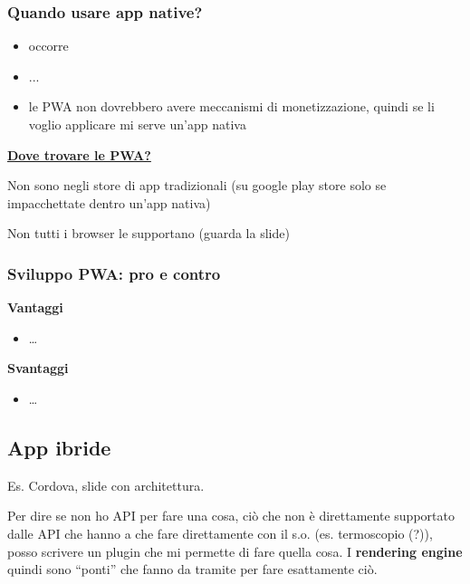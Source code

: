 \subsubsection{Quando usare app native?}
\begin{itemize}
    \item occorre 
    \item ...
    \item le PWA non dovrebbero avere meccanismi di monetizzazione, quindi se li voglio applicare mi serve un'app nativa
\end{itemize}
\par \textbf{\underline{Dove trovare le PWA?}}
\par Non sono negli store di app tradizionali (su google play store solo se impacchettate dentro un'app nativa)
\par Non tutti i browser le supportano (guarda la slide)

\subsubsection{Sviluppo PWA: pro e contro}
\par \textbf{Vantaggi}
\begin{itemize}
    \item \dots
\end{itemize}
\par \textbf{Svantaggi}
\begin{itemize}
    \item \dots
\end{itemize}

\subsection{App ibride}
\par Es. Cordova, slide con architettura.
\par Per dire se non ho API per fare una cosa, ciò che non è direttamente supportato dalle API che hanno a che fare direttamente con il s.o. (es. termoscopio (?)), posso scrivere un plugin che mi permette di fare quella cosa. I \textbf{rendering engine} quindi sono ``ponti'' che fanno da tramite per fare esattamente ciò.

